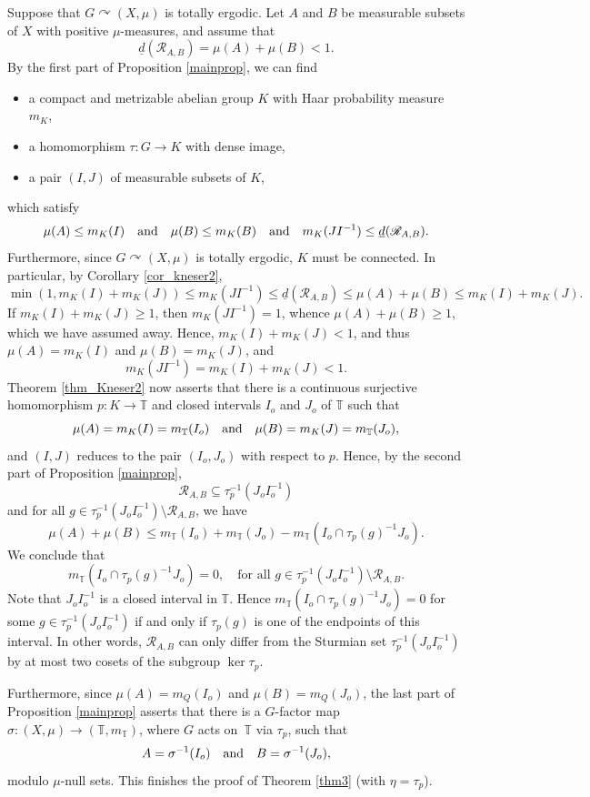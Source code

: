 \documentclass[10pt]{amsart}
\let\mathcal\mathscr
\newcommand{\cR}{\mathcal{R}}
\newcommand{\bT}{\mathbb{T}}
\newcommand{\qand}{\quad\textup{and}\quad}
\let\acts\curvearrowright
\theoremstyle{plain}
\theoremstyle{definition}
\begin{document}
Suppose that $G \acts (X,\mu)$ is totally ergodic. Let $A$ and $B$ be measurable subsets of $X$ with positive $\mu$-measures,
and assume that
\[
\underline{d}(\cR_{A,B}) = \mu(A) + \mu(B) < 1.
\]
By the first part of Proposition \ref{mainprop}, we can find
\begin{itemize}
\item a compact and metrizable abelian group $K$ with Haar probability measure $m_K$,
\item a homomorphism $\tau : G \to K$ with dense image,
\item a pair $(I,J)$ of measurable subsets of $K$,
\end{itemize}
which satisfy
\[
\mu(A) \leq m_K(I) \qand \mu(B) \leq m_K(B) \qand m_K(JI^{-1}) \leq \underline{d}(\cR_{A,B}).
\]
Furthermore, since $G \acts (X,\mu)$ is totally ergodic, $K$ must be connected. In particular, by
Corollary \ref{cor_kneser2},
\[
\min(1,m_K(I) + m_K(J)) \leq m_K(JI^{-1}) \leq \underline{d}(\cR_{A,B}) \leq \mu(A) + \mu(B) \leq m_K(I) + m_K(J).
\]
If $m_K(I) + m_K(J) \geq 1$, then $m_K(JI^{-1}) = 1$, whence $\mu(A) + \mu(B) \geq 1$, which we have assumed away.
Hence, $m_K(I) + m_K(J) < 1$, and thus $\mu(A) = m_K(I)$ and $\mu(B) = m_K(J)$, and
\[
m_K(JI^{-1}) = m_K(I) + m_K(J) < 1.
\]
Theorem \ref{thm_Kneser2} now asserts
that there is a continuous surjective homomorphism \hbox{$p : K \to \bT$} and closed intervals $I_o$ and $J_o$ of $\bT$
such that
\[
\mu(A) = m_K(I) = m_\bT(I_o) \qand \mu(B) = m_K(J) = m_\bT(J_o),
\]
and $(I,J)$ reduces to the pair $(I_o,J_o)$ with respect to $p$. Hence, by the second part of Proposition \ref{mainprop},
\[
\cR_{A,B} \subseteq \tau_p^{-1}(J_o I_o^{-1})
\]
and for all $g \in \tau_p^{-1}(J_o I_o^{-1}) \setminus \cR_{A,B}$, we have
\[
\mu(A) + \mu(B) \leq m_\bT(I_o) + m_\bT(J_o) - m_\bT(I_o \cap \tau_p(g)^{-1}J_o).
\]
We conclude that
\[
m_\bT(I_o \cap \tau_p(g)^{-1}J_o) = 0, \quad \textrm{for all $g \in \tau_p^{-1}(J_o I_o^{-1}) \setminus \cR_{A,B}$}.
\]
Note that $J_o I_o^{-1}$ is a closed interval in $\bT$. Hence $m_\bT(I_o \cap \tau_p(g)^{-1}J_o) = 0$ for some
$g \in \tau_p^{-1}(J_o I_o^{-1})$ if and only if $\tau_p(g)$ is one of the endpoints of this interval. In other words,
$\cR_{A,B}$ can only differ from the Sturmian set $\tau_p^{-1}(J_o I_o^{-1})$ by at most two cosets of the
subgroup $\ker \tau_p$.

Furthermore, since $\mu(A) = m_Q(I_o)$ and $\mu(B) = m_Q(J_o)$, the last part of Proposition \ref{mainprop} asserts
that there is a $G$-factor map $\sigma : (X,\mu) \to (\bT,m_{\bT})$, where $G$ acts on~$\bT$ via $\tau_p$, such that
\[
A = \sigma^{-1}(I_o) \qand B = \sigma^{-1}(J_o),
\]
modulo $\mu$-null sets. This finishes the proof of Theorem \ref{thm3} (with $\eta = \tau_p$).
\end{document}
